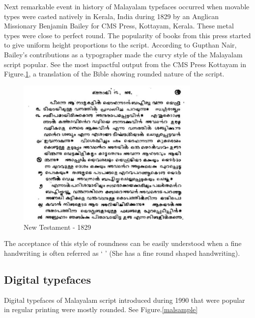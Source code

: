 \documentclass[11pt,twoside,a4paper]{article}
\begin{document}
Next remarkable event in history of Malayalam typefaces occurred when movable types were casted natively in Kerala, India during 1829 by an Anglican Missionary Benjamin Bailey\cite{babucherian} for CMS Press, Kottayam, Kerala. These metal types were close to perfect round. The popularity of books from this press started to give uniform height proportions to the script. According to Gupthan Nair, Bailey's contributions as a typographer made the curvy style of the Malayalam script popular\cite{gupthannair}. See the most impactful output from the CMS Press Kottayam in Figure.\ref{newtestament}, a translation of the Bible showing rounded nature of the script.


\begin{figure}
	\includegraphics[width=0.8\textwidth]{images/newtestament1829.png}
	\caption{New Testament - 1829}
	\label{newtestament}
\end{figure}

The acceptance of this style of roundness can be easily understood when a fine handwriting is often referred as `{ }' (She has a fine round shaped handwriting).


\subsection{Digital typefaces}

Digital typefaces of Malayalam script introduced during 1990 that were popular in regular printing were mostly rounded. See Figure.\ref{malsample}
\end{document}
